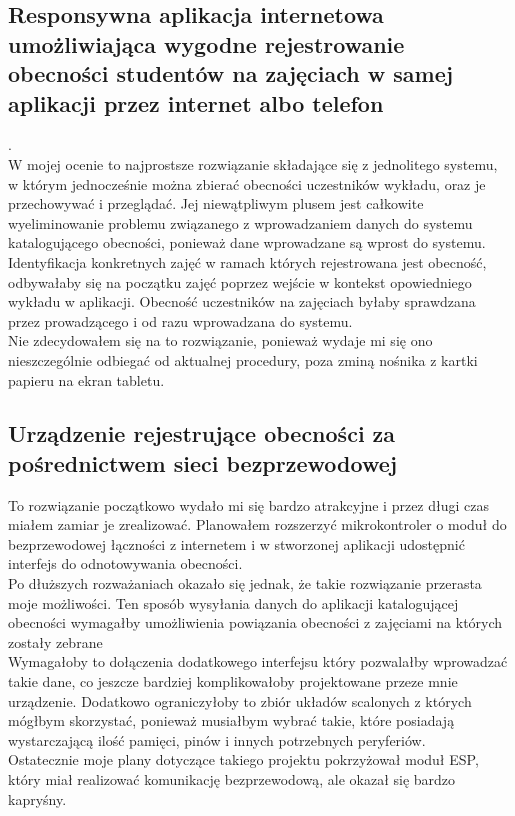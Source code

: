 \documentclass[declaration,shortabstract, mgr]{iithesis}
\begin{document}
\subsection{Responsywna aplikacja internetowa umożliwiająca wygodne rejestrowanie obecności studentów na zajęciach w samej aplikacji przez internet albo telefon}. \\
\indent W mojej ocenie to najprostsze rozwiązanie składające się z jednolitego systemu, w którym jednocześnie można zbierać obecności uczestników wykładu, oraz je przechowywać i przeglądać. Jej niewątpliwym plusem jest całkowite wyeliminowanie problemu związanego z wprowadzaniem danych do systemu katalogującego obecności, ponieważ dane wprowadzane są wprost do systemu. Identyfikacja konkretnych zajęć w ramach których rejestrowana jest obecność, odbywałaby się na początku zajęć poprzez wejście w kontekst opowiedniego wykładu w aplikacji. Obecność uczestników na zajęciach byłaby sprawdzana przez prowadzącego i od razu wprowadzana do systemu. \\
\indent Nie zdecydowałem się na to rozwiązanie, ponieważ wydaje mi się ono nieszczególnie odbiegać od aktualnej procedury, poza zminą nośnika z kartki papieru na ekran tabletu.

\subsection{Urządzenie rejestrujące obecności za pośrednictwem sieci bezprzewodowej}
\indent To rozwiązanie początkowo wydało mi się bardzo atrakcyjne i przez długi czas miałem zamiar je zrealizować. Planowałem rozszerzyć mikrokontroler o moduł do bezprzewodowej łączności z internetem i w stworzonej aplikacji udostępnić interfejs do odnotowywania obecności. \\
\indent Po dłuższych rozważaniach okazało się jednak, że takie rozwiązanie przerasta moje możliwości. Ten sposób wysyłania danych do aplikacji katalogującej obecności  wymagałby umożliwienia powiązania obecności z zajęciami na których zostały zebrane \\
\indent Wymagałoby to dołączenia dodatkowego interfejsu który pozwalałby wprowadzać takie dane, co jeszcze bardziej komplikowałoby projektowane przeze mnie urządzenie. Dodatkowo ograniczyłoby to zbiór układów scalonych z których mógłbym skorzystać, ponieważ musiałbym wybrać takie, które posiadają wystarczającą ilość pamięci, pinów i innych potrzebnych peryferiów. \\
\indent Ostatecznie moje plany dotyczące takiego projektu pokrzyżował moduł ESP, który miał realizować komunikację bezprzewodową, ale okazał się bardzo kapryśny.
\end{document}
